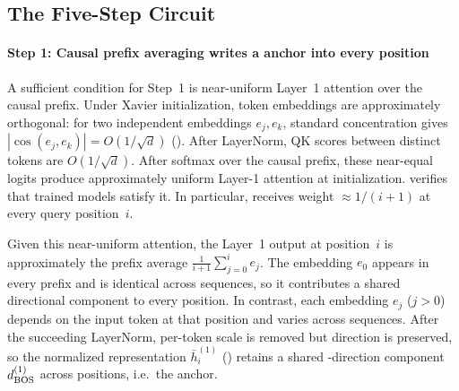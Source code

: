 \documentclass{article}
\theoremstyle{plain}
\theoremstyle{definition}
\theoremstyle{remark}
\begin{document}
\subsection{The Five-Step Circuit}
\label{subsec:mechanism}

\paragraph{Step 1: Causal prefix averaging writes a \bos anchor into every position}
\label{subsec:mech_step1}

A sufficient condition for Step~1 is near-uniform Layer~1 attention over the causal prefix.
Under Xavier initialization, token embeddings are approximately orthogonal: for two independent embeddings $e_j,e_k$, standard concentration gives $|\cos(e_j,e_k)|=O(1/\sqrt{d})$ ().
After LayerNorm, QK scores between distinct tokens are $O(1/\sqrt{d})$.
After softmax over the causal prefix, these near-equal logits produce approximately uniform Layer-1 attention at initialization.
 verifies that trained models satisfy it.
In particular, \bos receives weight $\approx 1/(i{+}1)$ at every query position~$i$.

Given this near-uniform attention, the Layer~1 output at position~$i$ is approximately the prefix average $\frac{1}{i+1}\sum_{j=0}^{i}e_j$.
The \bos embedding $e_0$ appears in every prefix and is identical across sequences, so it contributes a shared directional component to every position.
In contrast, each \nbos embedding $e_j$ ($j>0$) depends on the input token at that position and varies across sequences.
After the succeeding LayerNorm, per-token scale is removed but direction is preserved, so the normalized representation $\bar h_i^{(1)}$ () retains a shared \bos-direction component $d_{\text{BOS}}^{(1)}$ across positions, i.e.\ the \bos anchor.
\end{document}
